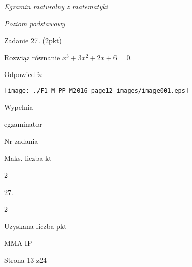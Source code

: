 \documentclass[a4paper,12pt]{article}
\begin{document}
{\it Egzamin maturalny z matematyki}

{\it Poziom podstawowy}

Zadanie 27. (2pkt)

Rozwiąz równanie $x^{3}+3x^{2}+2x+6=0.$

Odpowied $\acute{\mathrm{z}}$:
\begin{center}
\texttt{[image: ./F1\_M\_PP\_M2016\_page12\_images/image001.eps]}
\end{center}
Wypelnia

egzaminator

Nr zadania

Maks. liczba kt

2

27.

2

Uzyskana liczba pkt

MMA-IP

Strona 13 z24
\end{document}
